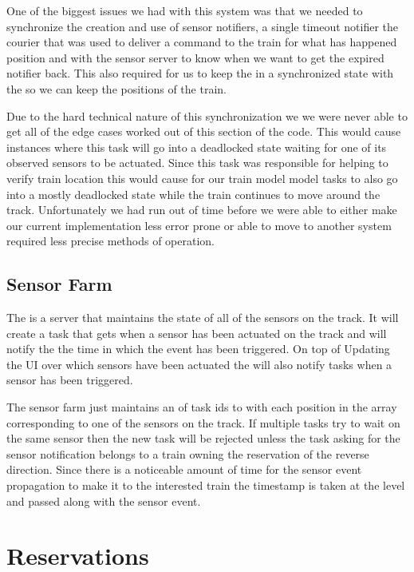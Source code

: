 \documentclass[pdftex,10pt,a4paper]{article}
\begin{document}
One of the biggest issues we had with this system was that we needed to
synchronize the creation and use of sensor notifiers, a single timeout notifier
the courier that was used to deliver a command to the train for what has
happened position and with the sensor server to know when we want to get the
expired notifier back. This also required for us to keep the 
 in a synchronized state with the  so we
can keep the positions of the train. 

Due to the hard technical nature of this synchronization we we were never able
to get all of the edge cases worked out of this section of the code. This would
cause instances where this task will go into a deadlocked state waiting for one
of its observed sensors to be actuated. Since this task was responsible for
helping to verify train location this would cause for our train model model
tasks to also go into a mostly deadlocked state while the train continues to
move around the track. Unfortunately we had run out of time before we were able
to either make our current implementation less error prone or able to move to
another system required less precise methods of operation.

\subsection*{Sensor Farm}

The  is a server that maintains the state of all of the
sensors on the track. It will create a task  that gets when
a sensor has been actuated on the track and will notify the 
the time in which the event has been triggered. On top of Updating the UI over
which sensors have been actuated the  will also notify tasks
when a sensor has been triggered.

The sensor farm just maintains an of task ids to with each position in the
array corresponding to one of the sensors on the track. If multiple tasks try
to wait on the same sensor then the new task will be rejected unless the task
asking for the sensor notification belongs to a train owning the reservation of
the reverse direction. Since there is a noticeable amount of time for the
sensor event propagation to make it to the interested train the timestamp is
taken at the  level and passed along with the sensor event.

\section*{Reservations}
\end{document}
